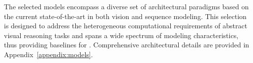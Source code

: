 



The selected models encompass a diverse set of architectural paradigms based on the current state-of-the-art in both vision and sequence modeling. This selection is designed to address the heterogeneous computational requirements of abstract visual reasoning tasks and spans a wide spectrum of modeling characteristics, thus providing baselines for \generatorName. Comprehensive architectural details are provided in Appendix~\ref{appendix:models}.


